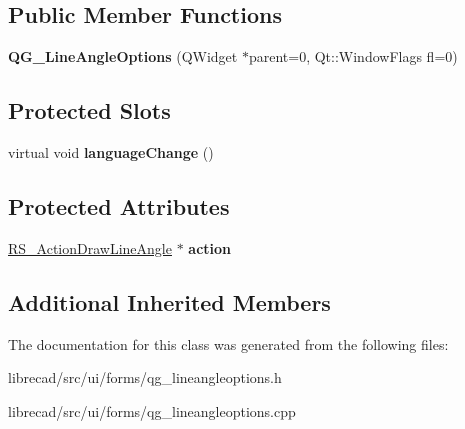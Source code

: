 \subsection*{Public Member Functions}
\begin{DoxyCompactItemize}
\item 
\hypertarget{classQG__LineAngleOptions_a02c4feab05bbb07f4005d2118cd869de}{{\bfseries Q\-G\-\_\-\-Line\-Angle\-Options} (Q\-Widget $\ast$parent=0, Qt\-::\-Window\-Flags fl=0)}\label{classQG__LineAngleOptions_a02c4feab05bbb07f4005d2118cd869de}

\end{DoxyCompactItemize}
\subsection*{Protected Slots}
\begin{DoxyCompactItemize}
\item 
\hypertarget{classQG__LineAngleOptions_aa8d9f1e0f1921a1c3dbae87a3dbb12f8}{virtual void {\bfseries language\-Change} ()}\label{classQG__LineAngleOptions_aa8d9f1e0f1921a1c3dbae87a3dbb12f8}

\end{DoxyCompactItemize}
\subsection*{Protected Attributes}
\begin{DoxyCompactItemize}
\item 
\hypertarget{classQG__LineAngleOptions_aa07ed9f2e95716de1da1aa187894e1a4}{\hyperlink{classRS__ActionDrawLineAngle}{R\-S\-\_\-\-Action\-Draw\-Line\-Angle} $\ast$ {\bfseries action}}\label{classQG__LineAngleOptions_aa07ed9f2e95716de1da1aa187894e1a4}

\end{DoxyCompactItemize}
\subsection*{Additional Inherited Members}


The documentation for this class was generated from the following files\-:\begin{DoxyCompactItemize}
\item 
librecad/src/ui/forms/qg\-\_\-lineangleoptions.\-h\item 
librecad/src/ui/forms/qg\-\_\-lineangleoptions.\-cpp\end{DoxyCompactItemize}
